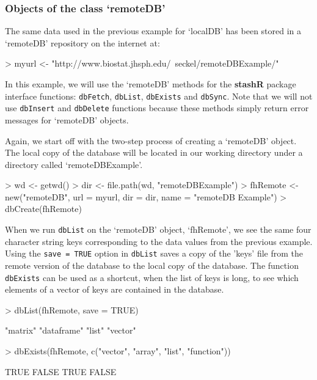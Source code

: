 \documentclass{article}
\newcommand{\pkg}{\textbf}
\newcommand{\code}{\texttt}
\begin{document}
\subsubsection{Objects of the class `remoteDB'} 

The same data used in the previous example for `localDB'
has been stored in a `remoteDB' repository on the internet at:
\begin{Schunk}
\begin{Sinput}
> myurl <- "http://www.biostat.jhsph.edu/~seckel/remoteDBExample/"
\end{Sinput}
\end{Schunk}

In this example, we will use the `remoteDB' methods for 
the \pkg{stashR} package interface functions: \code{dbFetch}, 
\code{dbList}, \code{dbExists} and \code{dbSync}. Note that we will 
not use \code{dbInsert} and \code{dbDelete} functions because these methods 
simply return error messages for `remoteDB' objects.  

Again, we start off with the two-step process of creating a `remoteDB' 
object. The local copy of the database will be located in our working
directory under a directory called `remoteDBExample'. 

\begin{Schunk}
\begin{Sinput}
> wd <- getwd()
> dir <- file.path(wd, "remoteDBExample")
> fhRemote <- new("remoteDB", url = myurl, dir = dir, name = "remoteDB Example")
> dbCreate(fhRemote)
\end{Sinput}
\end{Schunk}

\noindent When we run \code{dbList} on the `remoteDB' object, `fhRemote',
we see the same four character string keys corresponding to the data values
from the previous example. Using the \code{save = TRUE} option in \code{dbList}
saves a copy of the 'keys' file from the remote version of the database to 
the local copy of the database. The function \code{dbExists} can be used as a
shortcut, when the list of keys is long, to see which elements of a vector 
of keys are contained in the database.

\begin{Schunk}
\begin{Sinput}
> dbList(fhRemote, save = TRUE)
\end{Sinput}
\begin{Soutput}
[1] "matrix"    "dataframe" "list"      "vector"   
\end{Soutput}
\begin{Sinput}
> dbExists(fhRemote, c("vector", "array", "list", "function"))
\end{Sinput}
\begin{Soutput}
[1]  TRUE FALSE  TRUE FALSE
\end{Soutput}
\end{Schunk}
\end{document}
